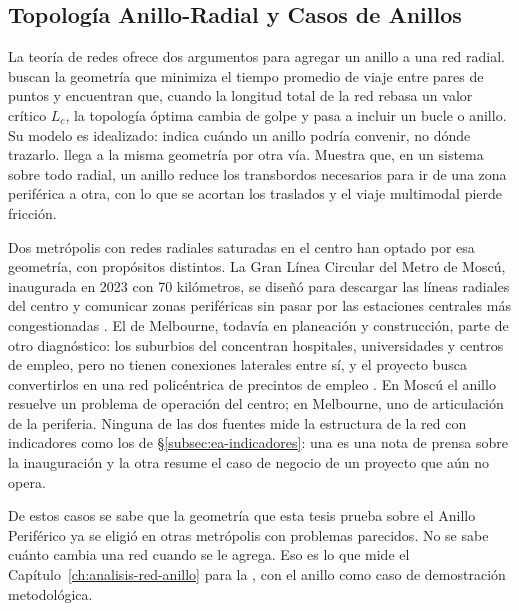 
\subsection{Topología Anillo-Radial y Casos de Anillos}
\label{subsec:ea-anillo-radial}

La teoría de redes ofrece dos argumentos para agregar un anillo a una red
radial. \citet{aldous2019optimal} buscan la geometría que minimiza el tiempo
promedio de viaje entre pares de puntos y encuentran que, cuando la longitud
total de la red rebasa un valor crítico $L_c$, la topología óptima cambia de
golpe y pasa a incluir un bucle o anillo. Su modelo es idealizado: indica cuándo
un anillo podría convenir, no dónde trazarlo. \citet{owais2020} llega a la misma
geometría por otra vía. Muestra que, en un sistema sobre todo radial, un anillo
reduce los transbordos necesarios para ir de una zona periférica a otra, con lo
que se acortan los traslados y el viaje multimodal pierde fricción.

\label{sec:casos-similares}
Dos metrópolis con redes radiales saturadas en el centro han optado por esa
geometría, con propósitos distintos. La Gran Línea Circular del Metro de Moscú,
inaugurada en 2023 con 70 kilómetros, se diseñó para descargar las líneas
radiales del centro y comunicar zonas periféricas sin pasar por las estaciones
centrales más congestionadas \citep{efe2023}. El  de
Melbourne, todavía en planeación y construcción, parte de otro diagnóstico: los
suburbios del  concentran hospitales, universidades y
centros de empleo, pero no tienen conexiones laterales entre sí, y el proyecto
busca convertirlos en una red policéntrica de precintos de empleo
\citep{suburbanrailloop2021}. En Moscú el anillo resuelve un problema de
operación del centro; en Melbourne, uno de articulación de la periferia. Ninguna
de las dos fuentes mide la estructura de la red con indicadores como los de
§\ref{subsec:ea-indicadores}: una es una nota de prensa sobre la inauguración y
la otra resume el caso de negocio de un proyecto que aún no opera.

De estos casos se sabe que la geometría que esta tesis prueba sobre el Anillo
Periférico ya se eligió en otras metrópolis con problemas parecidos. No se sabe
cuánto cambia una red cuando se le agrega. Eso es lo que mide el
Capítulo~\ref{ch:analisis-red-anillo} para la \zmvm{}, con el anillo como caso
de demostración metodológica.
